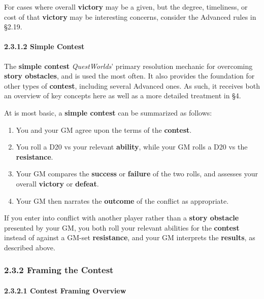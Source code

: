 \documentclass[
]{article}
\providecommand{\tightlist}{%
  \setlength{\itemsep}{0pt}\setlength{\parskip}{0pt}}
\begin{document}
For cases where overall \textbf{victory} may be a given, but the degree,
timeliness, or cost of that \textbf{victory} may be interesting
concerns, consider the Advanced rules in §2.19.

\hypertarget{simple-contest}{%
\paragraph{2.3.1.2 Simple Contest}\label{simple-contest}}

The \textbf{simple contest} \emph{QuestWorlds}' primary resolution
mechanic for overcoming \textbf{story obstacles}, and is used the most
often. It also provides the foundation for other types of
\textbf{contest}, including several Advanced ones. As such, it receives
both an overview of key concepts here as well as a more detailed
treatment in §4.

At is most basic, a \textbf{simple contest} can be summarized as
follows:

\begin{enumerate}
\def\labelenumi{\arabic{enumi}.}
\tightlist
\item
  You and your GM agree upon the terms of the \textbf{contest}.
\item
  You roll a D20 vs your relevant \textbf{ability}, while your GM rolls
  a D20 vs the \textbf{resistance}.
\item
  Your GM compares the \textbf{success} or \textbf{failure} of the two
  rolls, and assesses your overall \textbf{victory} or \textbf{defeat}.
\item
  Your GM then narrates the \textbf{outcome} of the conflict as
  appropriate.
\end{enumerate}

If you enter into conflict with another player rather than a
\textbf{story obstacle} presented by your GM, you both roll your
relevant abilities for the \textbf{contest} instead of against a GM-set
\textbf{resistance}, and your GM interprets the \textbf{results}, as
described above.

\hypertarget{framing-the-contest}{%
\subsubsection{2.3.2 Framing the Contest}\label{framing-the-contest}}

\hypertarget{contest-framing-overview}{%
\paragraph{2.3.2.1 Contest Framing
Overview}\label{contest-framing-overview}}
\end{document}
